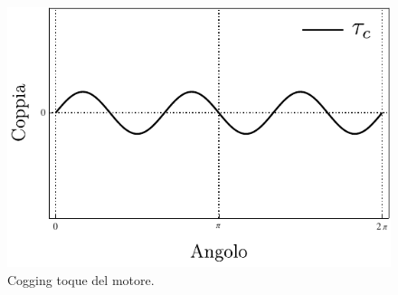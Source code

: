 \begin{figure}[t]
    \centering
    \includegraphics{assets/cogging-torque}
    \caption[Cogging torque]{Cogging toque del motore.}
    \label{fig:cogging}
\end{figure}
